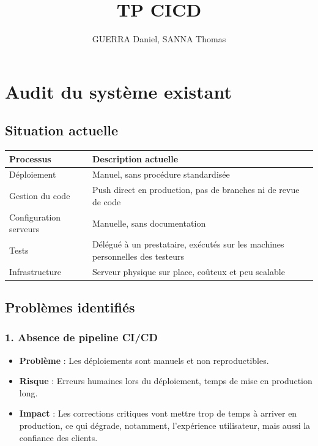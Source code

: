\documentclass{article}
\title{TP CICD}
\author{GUERRA Daniel, SANNA Thomas}
\date{}
\begin{document}
\maketitle

\section{Audit du système existant}

\subsection{Situation actuelle}

\begin{tabularx}{\textwidth}{|l|X|}
\hline
\textbf{Processus} & \textbf{Description actuelle} \\
\hline
Déploiement & Manuel, sans procédure standardisée \\
\hline
Gestion du code & Push direct en production, pas de branches ni de revue de code \\
\hline
Configuration serveurs & Manuelle, sans documentation \\
\hline
Tests & Délégué à un prestataire, exécutés sur les machines personnelles des testeurs \\
\hline
Infrastructure & Serveur physique sur place, coûteux et peu scalable \\
\hline
\end{tabularx}

\subsection{Problèmes identifiés}

\subsubsection{1. Absence de pipeline CI/CD}
\begin{itemize}
    \item \textbf{Problème} : Les déploiements sont manuels et non reproductibles.
    \item \textbf{Risque} : Erreurs humaines lors du déploiement, temps de mise en production long.
    \item \textbf{Impact} : Les corrections critiques vont mettre trop de temps à arriver en production, ce qui dégrade, notamment, l'expérience utilisateur, mais aussi la confiance des clients.
\end{itemize}
\end{document}
